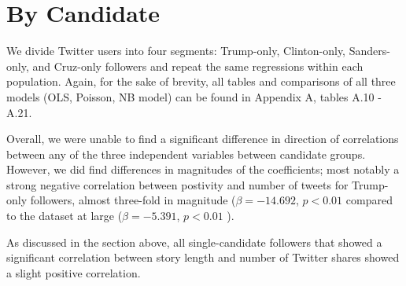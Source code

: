\section{By Candidate} 

We divide Twitter users into four segments: Trump-only, Clinton-only, Sanders-only, and Cruz-only followers and repeat the same regressions within each population. Again, for the sake of brevity, all tables and comparisons of all three models (OLS, Poisson, NB model) can be found in Appendix A, tables A.10 - A.21.

Overall, we were unable to find a significant difference in direction of correlations between any of the three independent variables between candidate groups. However, we did find differences in magnitudes of the coefficients; most notably a strong negative correlation between postivity and number of tweets for Trump-only followers, almost three-fold in magnitude ($\beta=-14.692$, $p<0.01$ compared to the dataset at large ($\beta=-5.391$, $p<0.01$ ).

As discussed in the section above, all single-candidate followers that showed a significant correlation between story length and number of Twitter shares showed a slight positive correlation.













